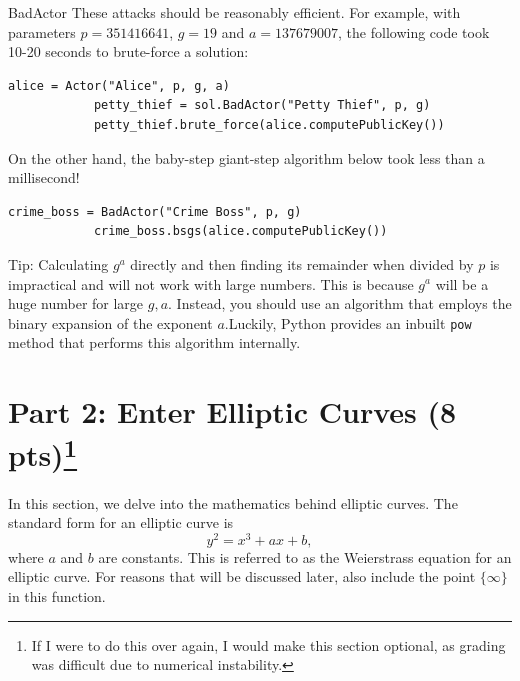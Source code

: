 \documentclass{article}
\begin{document}
\begin{tcolorbox}[enhanced,interior style={top color=Plum!20,bottom color=Plum!30}]
\begin{mybox}[
            colframe=purple!50!black,
            colback=purple!30,
            colbacktitle=purple!50!white,
            coltitle=purple!30!black,
            ]{BadActor}
        These attacks should be reasonably efficient. For example, with parameters $p = 351416641$, $g = 19$ and $a = 137679007$, the following code took 10-20 seconds to brute-force a solution:
        \begin{lstlisting}[belowskip=-6pt]
            alice = Actor("Alice", p, g, a)
            petty_thief = sol.BadActor("Petty Thief", p, g)
            petty_thief.brute_force(alice.computePublicKey())
        \end{lstlisting}
        On the other hand, the baby-step giant-step algorithm below took less than a millisecond!
        \begin{lstlisting}[belowskip=-10pt]
            crime_boss = BadActor("Crime Boss", p, g)
            crime_boss.bsgs(alice.computePublicKey())
        \end{lstlisting}
        
        \end{mybox}
    
        \vspace{2mm}
        Tip: Calculating $g^{a}$ directly and then finding its remainder when divided by $p$ is impractical and will not work with large numbers. This is because $g^{a}$ will be a huge number for large $g, a$. Instead, you should use an algorithm that employs the binary expansion of the exponent $a$.\footnotemark Luckily, Python provides an inbuilt \lstinline{pow} method that performs this algorithm internally.
    \end{tcolorbox}

\section*{Part 2: Enter Elliptic Curves (8 pts)\footnote{If I were to do this over again, I would make this section optional, as grading was difficult due to numerical instability.}}
    In this section, we delve into the mathematics behind elliptic curves. The standard form for an elliptic curve is $$y^{2} = x^{3} + ax + b,$$ where $a$ and $b$ are constants. This is referred to as the Weierstrass equation for an elliptic curve. For reasons that will be discussed later, also include the point $\{\infty\}$ in this function.
\end{document}
